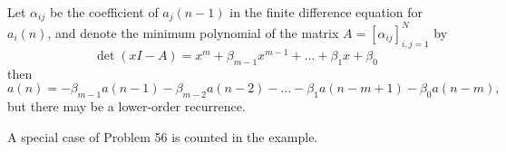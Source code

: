 \documentclass{article}
\begin{document}
\begin{note}
  Let $\alpha_{ij}$ be the coefficient of $a_j(n-1)$ in the finite difference
  equation for $a_i(n)$, and denote the minimum polynomial of the matrix $A = [\alpha_{ij}]_{i,j=1}^N$ by \[
    \det(xI - A) = x^m + \beta_{m-1}x^{m-1} + \hdots + \beta_1x + \beta_0
  \] then \[
    a(n) = -\beta_{m-1}a(n-1) -\beta_{m-2}a(n-2) - \hdots - \beta_1a(n-m+1) - \beta_0a(n-m),
  \] but there may be a lower-order recurrence.
\end{note}

\begin{references}
  \item A special case of Problem 56 is counted in the example.
\end{references}
\end{document}
